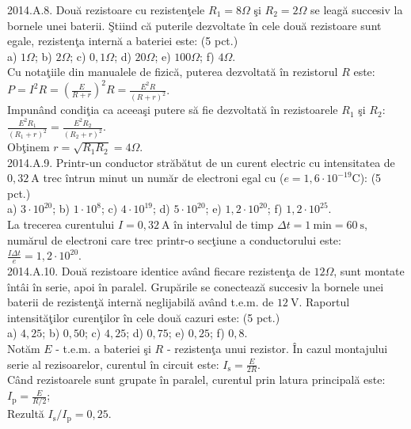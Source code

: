 2014.A.8. Două rezistoare cu rezistenţele $R_{1}=8 \Omega$ şi $R_{2}=2 \Omega$ se leagă succesiv la bornele unei baterii. Ştiind că puterile dezvoltate în cele două rezistoare sunt egale, rezistenţa internă a bateriei este: (5 pct.)\\ a) $1 \Omega$; b) $2 \Omega$; c) $0,1 \Omega$; d) $20 \Omega$; e) $100 \Omega$; f) $4 \Omega$.\\ Cu notaţiile din manualele de fizică, puterea dezvoltată în rezistorul $R$ este:\\ $P=I^{2} R=\left(\frac{E}{R+r}\right)^{2} R=\frac{E^{2} R}{(R+r)^{2}}$.\\ Impunând condiţia ca aceeaşi putere să fie dezvoltată în rezistoarele $R_{1}$ şi $R_{2}$:\\ $\frac{E^{2} R_{1}}{\left(R_{1}+r\right)^{2}}=\frac{E^{2} R_{2}}{\left(R_{2}+r\right)^{2}}$.\\ Obţinem $r=\sqrt{R_{1} R_{2}}=4 \Omega$.\\

2014.A.9. Printr-un conductor străbătut de un curent electric cu intensitatea de $0,32 \mathrm{~A}$ trec întrun minut un număr de electroni egal cu ($e=1,6 \cdot 10^{-19} \mathrm{C}$): (5 pct.)\\ a) $3 \cdot 10^{20}$; b) $1 \cdot 10^{8}$; c) $4 \cdot 10^{19}$; d) $5 \cdot 10^{20}$; e) $1,2 \cdot 10^{20}$; f) $1,2 \cdot 10^{25}$.\\ La trecerea curentului $I=0,32 \mathrm{~A}$ în intervalul de timp $\Delta t=1 \mathrm{~min}=60 \mathrm{~s}$, numărul de electroni care trec printr-o secţiune a conductorului este:\\ $\frac{I \Delta t}{e}=1,2 \cdot 10^{20}$.\\

2014.A.10. Două rezistoare identice având fiecare rezistenţa de $12 \Omega$, sunt montate întâi în serie, apoi în paralel. Grupările se conectează succesiv la bornele unei baterii de rezistenţă internă neglijabilă având t.e.m. de $12 \mathrm{~V}$. Raportul intensităţilor curenţilor în cele două cazuri este: (5 pct.)\\ a) $4,25$; b) $0,50$; c) $4,25$; d) $0,75$; e) $0,25$; f) $0,8$.\\ Notăm $E$ - t.e.m. a bateriei şi $R$ - rezistenţa unui rezistor. În cazul montajului serie al rezisoarelor, curentul în circuit este: $I_{\mathrm{s}}=\frac{E}{2 R}$.\\ Când rezistoarele sunt grupate în paralel, curentul prin latura principală este:\\ $I_{\mathrm{p}}=\frac{E}{R / 2}$;\\ Rezultă $I_{\mathrm{s}} / I_{\mathrm{p}}=0,25$.\\


